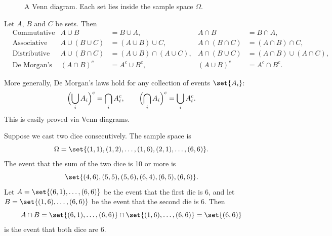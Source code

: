 \begin{figure}[ht]
\centering
{}
\caption{A Venn diagram. Each set lies inside the sample space $\Omega$.}
\label{fig:venn-diagram}
\end{figure}

\begin{theorem}\label{thm:set-laws}
Let $A$, $B$ and $C$ be sets. Then
\begin{align*}
  &\text{Commutative laws:} & A \cup B &= B \cup A, & A \cap B &= B \cap A, \\
  &\text{Associative laws:} & A \cup (B \cup C) &= (A \cup B) \cup C, & A \cap (B \cap C) &= (A \cap B) \cap C, \\
  &\text{Distributive laws:} & A \cup (B \cap C) &= (A \cup B) \cap (A \cup C), & A \cap (B \cup C) &= (A \cap B) \cup (A \cap C), \\
  &\text{De Morgan's laws:} & (A \cap B)^c &= A^c \cup B^c, & (A \cup B)^c &= A^c \cap B^c.
\end{align*}
\end{theorem}

More generally, De Morgan's laws hold for any collection of events $\set{A_i}$:
\begin{equation}\label{eq:de-morgan}
  \Bigl(\bigcup_i A_i\Bigr)^c = \bigcap_i A_i^c, \qquad \Bigl(\bigcap_i A_i\Bigr)^c = \bigcup_i A_i^c.
\end{equation}
This is easily proved via Venn diagrams.

\begin{example}\label{ex:two-dice-events}
Suppose we cast two dice consecutively. The sample space is
\[
  \Omega = \set{(1,1), (1,2), \ldots, (1,6), (2,1), \ldots, (6,6)}.
\]
The event that the sum of the two dice is 10 or more is
\[
  \set{(4,6), (5,5), (5,6), (6,4), (6,5), (6,6)}.
\]
Let $A = \set{(6,1), \ldots, (6,6)}$ be the event that the first die is 6, and let $B = \set{(1,6), \ldots, (6,6)}$ be the event that the second die is 6. Then
\[
  A \cap B = \set{(6,1), \ldots, (6,6)} \cap \set{(1,6), \ldots, (6,6)} = \set{(6,6)}
\]
is the event that both dice are 6.
\end{example}

